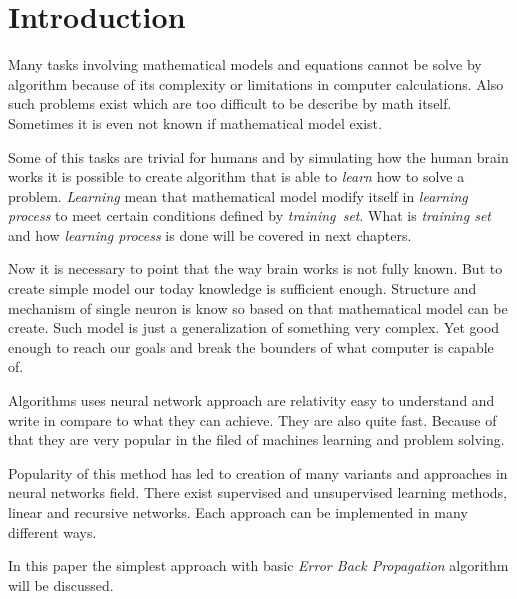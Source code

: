 \section{Introduction}
Many tasks involving mathematical models and equations cannot be solve by algorithm because of its complexity or limitations in computer calculations. Also such problems exist which are too difficult to be describe by math itself. Sometimes it is even not known if mathematical model exist.

Some of this tasks are trivial for humans and by simulating how the human brain works it is possible to create algorithm that is able to \textit{learn} how to solve a problem. \textit{Learning} mean that mathematical model modify itself in \textit{learning process} to meet certain conditions defined by \textit{training~set}. What is \textit{training set} and how \textit{learning process} is done will be covered in next chapters.

Now it is necessary to point that the way brain works is not fully known. But to create simple model our today knowledge is sufficient enough. Structure and mechanism of single neuron is know so based on that mathematical model can be create. Such model is just a generalization of something very complex. Yet good enough to reach our goals and break the bounders of what computer is capable of.

Algorithms uses neural network approach are relativity easy to understand and write in compare to what they can achieve. They are also quite fast. Because of that they are very popular in the filed of machines learning and problem solving.

Popularity of this method has led to creation of many variants and approaches in neural networks field. There exist supervised and unsupervised learning methods, linear and recursive networks. Each approach can be implemented in many different ways.

In this paper the simplest approach with basic \textit{Error Back Propagation} algorithm will be discussed.